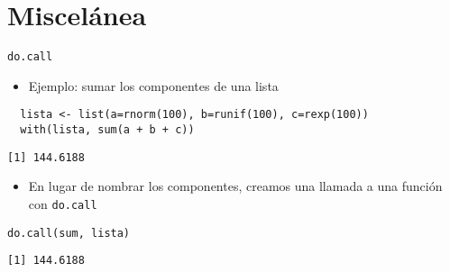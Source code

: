 \documentclass[xcolor={usenames,svgnames,dvipsnames}]{beamer}
\begin{document}
\section{Miscelánea}
\label{sec:orgheadline33}
\begin{frame}[fragile,label={sec:orgheadline28}]{\texttt{do.call}}
 \begin{itemize}
\item Ejemplo: sumar los componentes de una lista
\end{itemize}
\lstset{language=R,label= ,caption= ,captionpos=b,numbers=none}
\begin{lstlisting}
  lista <- list(a=rnorm(100), b=runif(100), c=rexp(100))
  with(lista, sum(a + b + c))
\end{lstlisting}

\begin{verbatim}
[1] 144.6188
\end{verbatim}

\begin{itemize}
\item En lugar de nombrar los componentes, creamos una llamada a una
función con \texttt{do.call}
\end{itemize}
\lstset{language=R,label= ,caption= ,captionpos=b,numbers=none}
\begin{lstlisting}
do.call(sum, lista)
\end{lstlisting}

\begin{verbatim}
[1] 144.6188
\end{verbatim}
\end{frame}
\end{document}
